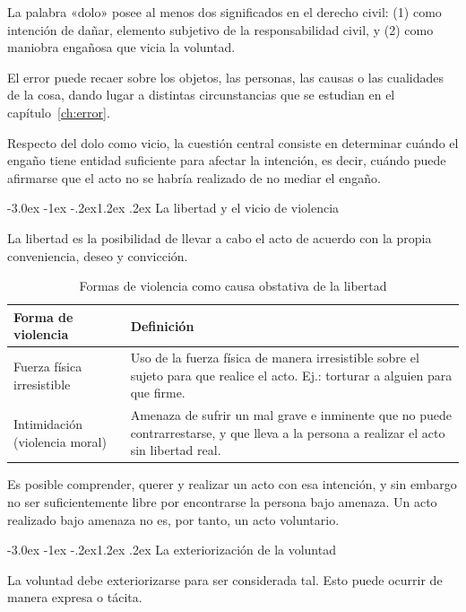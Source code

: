 \documentclass[12pt,oneside]{book}
\makeatletter
\renewcommand\section{\@startsection{section}{1}{\z@}%
  {-3.0ex \@plus -1ex \@minus -.2ex}{1.2ex \@plus .2ex}%
  {\normalfont\large\bfseries\color{acento}}}
\makeatother
\begin{document}
La palabra «dolo» posee al menos dos significados en el derecho civil: (1) como intención de dañar, elemento subjetivo de la responsabilidad civil, y (2) como maniobra engañosa que vicia la voluntad.

El error puede recaer sobre los objetos, las personas, las causas o las cualidades de la cosa, dando lugar a distintas circunstancias que se estudian en el capítulo~\ref{ch:error}.

Respecto del dolo como vicio, la cuestión central consiste en determinar cuándo el engaño tiene entidad suficiente para afectar la intención, es decir, cuándo puede afirmarse que el acto no se habría realizado de no mediar el engaño.

\section{La libertad y el vicio de violencia}

La libertad es la posibilidad de llevar a cabo el acto de acuerdo con la propia conveniencia, deseo y convicción.

\begin{table}[H]
\centering
\caption{Formas de violencia como causa obstativa de la libertad}
\begin{tabularx}{\textwidth}{l X}
\toprule
\textbf{Forma de violencia} & \textbf{Definición} \\
\midrule
Fuerza física irresistible & Uso de la fuerza física de manera irresistible sobre el sujeto para que realice el acto. Ej.: torturar a alguien para que firme. \\
Intimidación (violencia moral) & Amenaza de sufrir un mal grave e inminente que no puede contrarrestarse, y que lleva a la persona a realizar el acto sin libertad real. \\
\bottomrule
\end{tabularx}
\end{table}

Es posible comprender, querer y realizar un acto con esa intención, y sin embargo no ser suficientemente libre por encontrarse la persona bajo amenaza. Un acto realizado bajo amenaza no es, por tanto, un acto voluntario.

\section{La exteriorización de la voluntad}

La voluntad debe exteriorizarse para ser considerada tal. Esto puede ocurrir de manera expresa o tácita.
\end{document}
